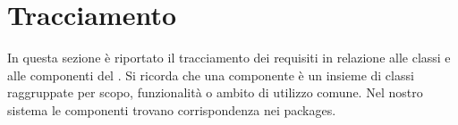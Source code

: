 \section{Tracciamento}
In questa sezione è riportato il tracciamento dei requisiti in relazione alle classi e alle componenti del . Si ricorda che una componente è un insieme di classi raggruppate per scopo, funzionalità o ambito di utilizzo comune. Nel nostro sistema le componenti trovano corrispondenza nei packages.   




